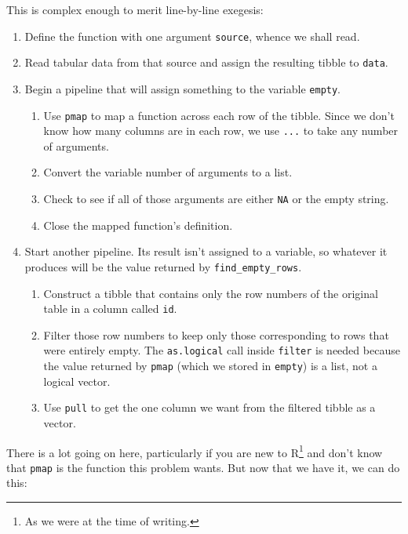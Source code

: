 \noindent
This is complex enough to merit line-by-line exegesis:

\begin{enumerate}
\item
  Define the function with one argument \texttt{source}, whence we shall read.
\item
  Read tabular data from that source and assign the resulting tibble to \texttt{data}.
\item
  Begin a pipeline that will assign something to the variable \texttt{empty}.

  \begin{enumerate}
    \item
    Use \texttt{pmap} to map a function across each row of the tibble.
    Since we don't know how many columns are in each row,
    we use \texttt{...} to take any number of arguments.
  \item
    Convert the variable number of arguments to a list.
  \item
    Check to see if all of those arguments are either \texttt{NA} or the empty string.
  \item
    Close the mapped function's definition.
  \end{enumerate}
\item
  Start another pipeline.
  Its result isn't assigned to a variable,
  so whatever it produces will be the value returned by \texttt{find\_empty\_rows}.

  \begin{enumerate}
    \item
    Construct a tibble that contains only the row numbers of the original table in a column called \texttt{id}.
  \item
    Filter those row numbers to keep only those corresponding to rows that were entirely empty.
    The \texttt{as.logical} call inside \texttt{filter} is needed because the value returned by \texttt{pmap}
    (which we stored in \texttt{empty})
    is a list, not a logical vector.
  \item
    Use \texttt{pull} to get the one column we want from the filtered tibble as a vector.
  \end{enumerate}
\end{enumerate}

There is a lot going on here,
particularly if you are new to R\footnote{As we were at the time of writing.}
and don't know that \texttt{pmap} is the function this problem wants.
But now that we have it,
we can do this:

